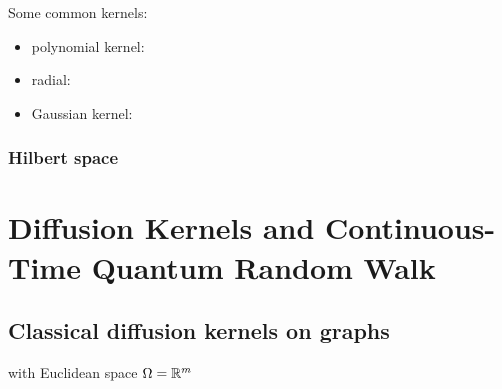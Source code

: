 Some common kernels: 
\begin{itemize}
	\item polynomial kernel:
	\item radial:
	\item Gaussian kernel:
\end{itemize}

\begin{definition}
	
\end{definition}
\begin{theorem}[Representer]
	
\end{theorem}

\subsubsection*{Hilbert space}

\section{Diffusion Kernels and Continuous-Time Quantum Random Walk}

\subsection{Classical diffusion kernels on graphs}
\cite{kondorDiffusionKernelsGraphs2002}
with Euclidean space $\Omega = \mathbb{R}^m$

